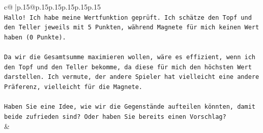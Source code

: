 \documentclass{article}
\begin{document}
{\begin{supertabular}{c@{$\;$}|p{.15\linewidth}@{}p{.15\linewidth}p{.15\linewidth}p{.15\linewidth}p{.15\linewidth}p{.15\linewidth}}
{{{\\ 
\texttt{Hallo! Ich habe meine Wertfunktion geprüft. Ich schätze den Topf und den Teller jeweils mit 5 Punkten, während Magnete für mich keinen Wert haben (0 Punkte).} \\
\\ 
\texttt{Da wir die Gesamtsumme maximieren wollen, wäre es effizient, wenn ich den Topf und den Teller bekomme, da diese für mich den höchsten Wert darstellen. Ich vermute, der andere Spieler hat vielleicht eine andere Präferenz, vielleicht für die Magnete.} \\
\\ 
\texttt{Haben Sie eine Idee, wie wir die Gegenstände aufteilen könnten, damit beide zufrieden sind? Oder haben Sie bereits einen Vorschlag?} \\
            }
        }
    }
    & \\ \\


\end{supertabular}}
\end{document}
